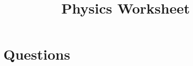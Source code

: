 \documentclass[12pt]{article}
\title{Physics Worksheet}
\date{}
\begin{document}
\maketitle

\section*{Questions}

\begin{enumerate}[leftmargin=*]
\end{enumerate}
\end{document}
